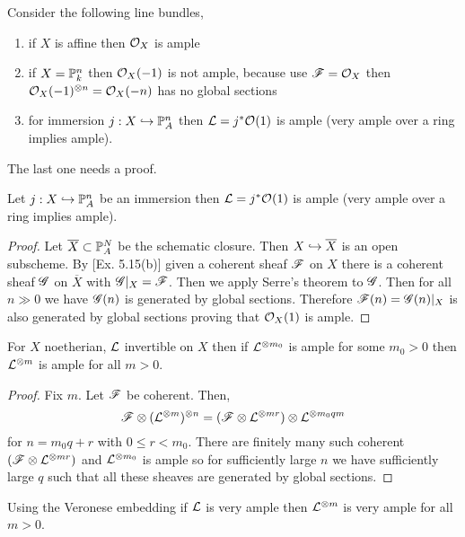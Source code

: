 \documentclass[12pt]{article}
\begin{document}
\begin{example}
Consider the following line bundles,
\begin{enumerate}
\item if $X$ is affine then $\struct{X}$ is ample
\item if $X = \P^n_k$ then $\struct{X}(-1)$ is not ample, because use $\F = \struct{X}$ then $\struct{X}(-1)^{\ot n} = \struct{X}(-n)$ has no global sections
\item for immersion $j : X \embed \P^n_A$ then $\L = j^* \struct{}(1)$ is ample (very ample over a ring implies ample).
\end{enumerate}
The last one needs a proof.
\end{example}

\begin{prop}
Let $j : X \embed \P^n_A$ be an immersion then $\L = j^* \struct{}(1)$ is ample (very ample over a ring implies ample).
\end{prop}

\begin{proof}
Let $\overline{X} \subset \P^N_A$ be the schematic closure. Then $X \embed \overline{X}$ is an open subscheme. By [Ex. 5.15(b)] given a coherent sheaf $\F$ on $X$ there is a coherent sheaf $\G$ on $\overline{X}$ with $\G |_X = \F$. Then we apply Serre's theorem to $\G$. Then for all $n \gg 0$ we have $\G(n)$ is generated by global sections. Therefore $\F(n) = \G(n) |_X$ is also generated by global sections proving that $\struct{X}(1)$ is ample. 
\end{proof}

\begin{lemma}
For $X$ noetherian, $\L$ invertible on $X$ then if $\L^{\ot m_0}$ is ample for some $m_0 > 0$ then $\L^{\ot m}$ is ample for all $m > 0$.
\end{lemma}

\begin{proof}
Fix $m$. Let $\F$ be coherent. Then,
\[ \F \ot (\L^{\ot m})^{\ot n} = (\F \ot \L^{\ot m r}) \ot \L^{\ot m_0 q m} \]
for $n = m_0 q + r$ with $0 \le r < m_0$. There are finitely many such coherent $(\F \ot \L^{\ot m r})$ and $\L^{\ot m_0}$ is ample so for sufficiently large $n$ we have sufficiently large $q$ such that all these sheaves are generated by global sections.
\end{proof}

\begin{rmk}
Using the Veronese embedding if $\L$ is very ample then $\L^{\ot m}$ is very ample for all $m > 0$.
\end{rmk}
\end{document}
